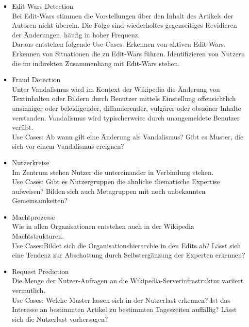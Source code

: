 \begin{itemize}
    \item Edit-Wars Detection\\ Bei Edit-Wars stimmen die Vorstellungen über den Inhalt des Artikels der Autoren nicht überein. Die Folge sind wiederholtes gegenseitiges Revidieren der Änderungen, häufig in hoher Frequenz.\cite{wikipediaprob.}\\ Daraus entstehen folgende Use Cases: Erkennen von aktiven Edit-Wars. Erkennen von Situationen die zu Edit-Wars führen. Identifizieren von Nutzern die im indirekten Zusammenhang mit Edit-Wars stehen.
    \item Fraud Detection\\Unter Vandalismus wird im Kontext der Wikipedia die Änderung von Textinhalten oder Bildern durch Benutzer mittels Einstellung offensichtlich unsinniger oder beleidigender, diffamierender, vulgärer oder obszöner Inhalte verstanden. Vandalismus wird typischerweise durch unangemeldete Benutzer verübt.\cite{wikipediaprob.} \\Use Cases: Ab wann gilt eine Änderung als Vandalismus? Gibt es Muster, die sich vor einem Vandalismus ereignen? 
    \item Nutzerkreise\\Im Zentrum stehen Nutzer die untereinander in Verbindung stehen.\\Use Cases: Gibt es Nutzergruppen die ähnliche thematische Expertise aufweisen? Bilden sich auch Metagruppen mit noch unbekannten Gemeinsamkeiten?
    \item Machtprozesse\\Wie in allen Organisationen entstehen auch in der Wikipedia Machtstrukturen.\\Use Cases:Bildet sich die Organisationshierarchie in den Edits ab? Lässt sich eine Tendenz zur Abschottung durch Selbstergänzung der Experten erkennen?\cite{wikipedia.}
    \item Request Prediction\\Die Menge der Nutzer-Anfragen an die Wikipedia-Serverinfrastruktur variiert vermutlich.\\Use Cases: Welche Muster lassen sich in der Nutzerlast erkennen? Ist das Interesse an bestimmten Artikel zu bestimmten Tageszeiten auffällig? Lässt sich die Nutzerlast vorhersagen?
\end{itemize}
